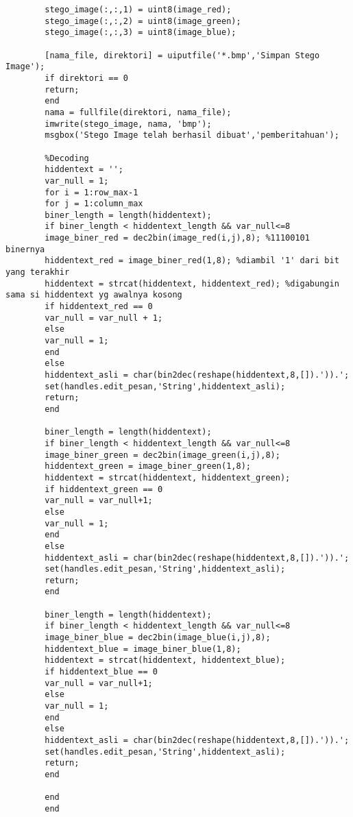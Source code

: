 \begin{verbatim}
		stego_image(:,:,1) = uint8(image_red);
		stego_image(:,:,2) = uint8(image_green);
		stego_image(:,:,3) = uint8(image_blue);
		
		[nama_file, direktori] = uiputfile('*.bmp','Simpan Stego Image');
		if direktori == 0
		return;
		end
		nama = fullfile(direktori, nama_file);
		imwrite(stego_image, nama, 'bmp');
		msgbox('Stego Image telah berhasil dibuat','pemberitahuan');	
	
		%Decoding
		hiddentext = '';
		var_null = 1;
		for i = 1:row_max-1
		for j = 1:column_max
		biner_length = length(hiddentext);
		if biner_length < hiddentext_length && var_null<=8
		image_biner_red = dec2bin(image_red(i,j),8); %11100101 binernya 
		hiddentext_red = image_biner_red(1,8); %diambil '1' dari bit yang terakhir
		hiddentext = strcat(hiddentext, hiddentext_red); %digabungin sama si hiddentext yg awalnya kosong
		if hiddentext_red == 0
		var_null = var_null + 1;
		else
		var_null = 1;
		end   
		else
		hiddentext_asli = char(bin2dec(reshape(hiddentext,8,[]).')).';
		set(handles.edit_pesan,'String',hiddentext_asli);
		return;
		end
		
		biner_length = length(hiddentext);
		if biner_length < hiddentext_length && var_null<=8
		image_biner_green = dec2bin(image_green(i,j),8);
		hiddentext_green = image_biner_green(1,8);
		hiddentext = strcat(hiddentext, hiddentext_green);
		if hiddentext_green == 0
		var_null = var_null+1;
		else
		var_null = 1;
		end   
		else
		hiddentext_asli = char(bin2dec(reshape(hiddentext,8,[]).')).';
		set(handles.edit_pesan,'String',hiddentext_asli);
		return;
		end
		
		biner_length = length(hiddentext);
		if biner_length < hiddentext_length && var_null<=8
		image_biner_blue = dec2bin(image_blue(i,j),8);
		hiddentext_blue = image_biner_blue(1,8);
		hiddentext = strcat(hiddentext, hiddentext_blue);
		if hiddentext_blue == 0
		var_null = var_null+1;
		else
		var_null = 1;
		end   
		else
		hiddentext_asli = char(bin2dec(reshape(hiddentext,8,[]).')).';
		set(handles.edit_pesan,'String',hiddentext_asli);
		return;
		end
		
		end
		end
	\end{verbatim}

